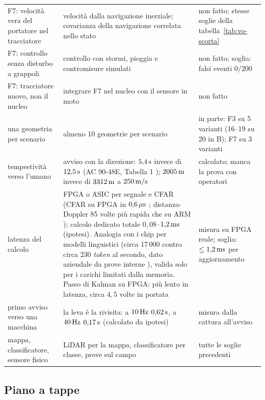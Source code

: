 {\begin{longtable}{@{}>{\RaggedRight\arraybackslash}p{3.3cm}>{\RaggedRight\arraybackslash}p{5.6cm}>{\RaggedRight\arraybackslash}p{5.8cm}@{}}
F7: velocità vera del portatore nel tracciatore & velocità dalla navigazione inerziale; covarianza della navigazione correlata nello stato & non fatto; stesse soglie della tabella~\ref{tab:vo-scorta}\\
F7: controllo senza disturbo a grappoli & controllo con stormi, pioggia e contromisure simulati & non fatto; soglia: falsi eventi $0/200$\\
F7: tracciatore nuovo, non il nucleo & integrare F7 nel nucleo con il sensore in moto & non fatto\\
una geometria per scenario & almeno 10 geometrie per scenario & in parte: F3 su 5 varianti (16--19 su 20 in B); F7 su 3 varianti\\
tempestività verso l'umano & avviso con la direzione: $5{,}4\,\mathrm{s}$ invece di $12{,}5\,\mathrm{s}$ (AC 90-48E, Tabella 1 \cite{faa-ac-90-48e}); $2005\,\mathrm{m}$ invece di $3312\,\mathrm{m}$ a $250\,\mathrm{m/s}$ & calcolato; manca la prova con operatori\\
latenza del calcolo & FPGA o ASIC per segnale e CFAR (CFAR su FPGA in $0{,}6\,\mathrm{\mu s}$ \cite{sim2023}; distanza-Doppler 85 volte più rapida che su ARM \cite{choi2021}); calcolo dedicato totale $0{,}08$--$1{,}2\,\mathrm{ms}$ (ipotesi). Analogia con i chip per modelli linguistici (circa 17\,000 contro circa 230 \emph{token} al secondo, dato aziendale da prove interne \cite{heise2026-taalas}), valida solo per i carichi limitati dalla memoria. Passo di Kalman su FPGA: più lento in latenza, circa $4{,}5$ volte in portata \cite{summers2018} & misura su FPGA reale; soglia: $\le1{,}2\,\mathrm{ms}$ per aggiornamento\\
primo avviso verso una macchina & la leva è la rivisita: a $10\,\mathrm{Hz}$ $0{,}62\,\mathrm{s}$, a $40\,\mathrm{Hz}$ $0{,}17\,\mathrm{s}$ (calcolato da ipotesi) & misura dalla cattura all'avviso\\
mappa, classificatore, sensore fisico & LiDAR per la mappa, classificatore per classe, prove sul campo & tutte le soglie precedenti\\
\end{longtable}}

\subsection{Piano a tappe}\label{sec:ps-piano}

